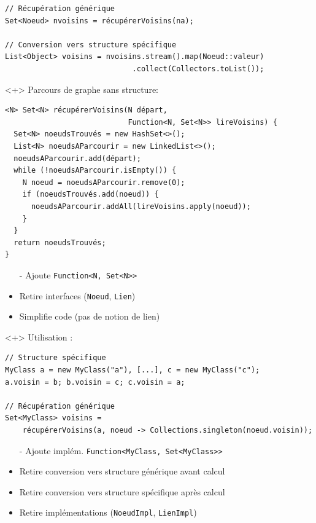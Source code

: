 \documentclass[draft]{beamer}
\begin{document}
\begin{frame}[fragile]
\begin{onlyenv}
\begin{lstlisting}
// Récupération générique
Set<Noeud> nvoisins = récupérerVoisins(na);

// Conversion vers structure spécifique
List<Object> voisins = nvoisins.stream().map(Noeud::valeur)
                             .collect(Collectors.toList());
  \end{lstlisting}
\end{onlyenv}
\begin{onlyenv}<+>
  Parcours de graphe sans structure:
  \begin{lstlisting}
<N> Set<N> récupérerVoisins(N départ,
                            Function<N, Set<N>> lireVoisins) {
  Set<N> noeudsTrouvés = new HashSet<>();
  List<N> noeudsAParcourir = new LinkedList<>();
  noeudsAParcourir.add(départ);
  while (!noeudsAParcourir.isEmpty()) {
    N noeud = noeudsAParcourir.remove(0);
    if (noeudsTrouvés.add(noeud)) {
      noeudsAParcourir.addAll(lireVoisins.apply(noeud));
    }
  }
  return noeudsTrouvés;
}
  \end{lstlisting}
  \begin{itemize}
   \item[-] Ajoute \lstinline{Function<N, Set<N>>}
   \item[+] Retire interfaces (\lstinline{Noeud}, \lstinline{Lien})
   \item[+] Simplifie code (pas de notion de lien)
  \end{itemize}
\end{onlyenv}
\begin{onlyenv}<+>
  Utilisation :
  \begin{lstlisting}
// Structure spécifique
MyClass a = new MyClass("a"), [...], c = new MyClass("c");
a.voisin = b; b.voisin = c; c.voisin = a;

// Récupération générique
Set<MyClass> voisins =
    récupérerVoisins(a, noeud -> Collections.singleton(noeud.voisin));
  \end{lstlisting}
  \begin{itemize}
   \item[-] Ajoute implém. {\lstinline{Function<MyClass, Set<MyClass>>}}
   \item[+] Retire conversion vers structure générique avant calcul
   \item[+] Retire conversion vers structure spécifique après calcul
   \item[+] Retire implémentations (\lstinline{NoeudImpl}, \lstinline{LienImpl})
  \end{itemize}
\end{onlyenv}
\end{frame}
\end{document}
